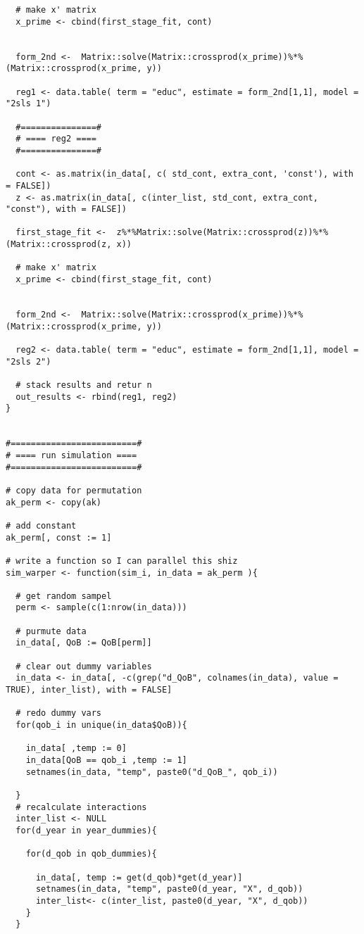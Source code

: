 \documentclass[12pt]{article}
\begin{document}
\begin{verbatim}
  # make x' matrix 
  x_prime <- cbind(first_stage_fit, cont)
  
  
  form_2nd <-  Matrix::solve(Matrix::crossprod(x_prime))%*%(Matrix::crossprod(x_prime, y))
  
  reg1 <- data.table( term = "educ", estimate = form_2nd[1,1], model = "2sls 1")
  
  #===============#
  # ==== reg2 ====
  #===============#
  
  cont <- as.matrix(in_data[, c( std_cont, extra_cont, 'const'), with = FALSE])
  z <- as.matrix(in_data[, c(inter_list, std_cont, extra_cont, "const"), with = FALSE])
  
  first_stage_fit <-  z%*%Matrix::solve(Matrix::crossprod(z))%*%(Matrix::crossprod(z, x))
  
  # make x' matrix 
  x_prime <- cbind(first_stage_fit, cont)
  
  
  form_2nd <-  Matrix::solve(Matrix::crossprod(x_prime))%*%(Matrix::crossprod(x_prime, y))
  
  reg2 <- data.table( term = "educ", estimate = form_2nd[1,1], model = "2sls 2")
  
  # stack results and retur n
  out_results <- rbind(reg1, reg2)
}


#=========================#
# ==== run simulation ====
#=========================#

# copy data for permutation 
ak_perm <- copy(ak)

# add constant 
ak_perm[, const := 1]

# write a function so I can parallel this shiz  
sim_warper <- function(sim_i, in_data = ak_perm ){
  
  # get random sampel 
  perm <- sample(c(1:nrow(in_data)))
  
  # purmute data 
  in_data[, QoB := QoB[perm]]
  
  # clear out dummy variables 
  in_data <- in_data[, -c(grep("d_QoB", colnames(in_data), value = TRUE), inter_list), with = FALSE]
  
  # redo dummy vars 
  for(qob_i in unique(in_data$QoB)){
    
    in_data[ ,temp := 0]
    in_data[QoB == qob_i ,temp := 1]
    setnames(in_data, "temp", paste0("d_QoB_", qob_i))
    
  }
  # recalculate interactions
  inter_list <- NULL
  for(d_year in year_dummies){
    
    for(d_qob in qob_dummies){
      
      in_data[, temp := get(d_qob)*get(d_year)]
      setnames(in_data, "temp", paste0(d_year, "X", d_qob))
      inter_list<- c(inter_list, paste0(d_year, "X", d_qob))
    }
  }
  

\end{verbatim}
\end{document}
